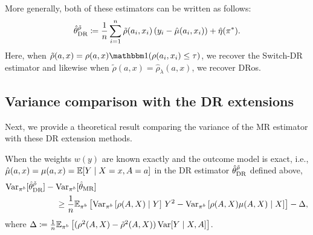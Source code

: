 More generally, both of these estimators can be written as follows:
\[
\hat{\theta}_{\textup{DR}}^{\tilde{\rho}} \coloneqq \frac{1}{n} \sum_{i=1}^n \tilde{\rho}(a_i, x_i)\,(y_i - \hat{\mu}(a_i, x_i)) + \hat{\eta}(\pi^*).
\]
Here, when $\tilde{\rho}(a, x) = \rho(a, x)\ind(\rho(a_i, x_i) \leq \tau)$, we recover the Switch-DR estimator and likewise when $\tilde{\rho}(a, x) = \hat{\rho}_\lambda(a, x)$, we recover DRos. 

\subsection{Variance comparison with the DR extensions}
Next, we provide a theoretical result comparing the variance of the MR estimator with these DR extension methods.
\begin{proposition}\label{prop:var_dr_extensions}
    When the weights $w(y)$ are known exactly and the outcome model is exact, i.e., $\hat{\mu}(a, x) = \mu(a, x) = \mathbb{E}[Y \mid X=x, A=a]$ in the DR estimator $\hat{\theta}_{\textup{DR}}^{\tilde{\rho}}$ defined above,
    \begin{align*}
    &\textup{Var}_{\pi^b}[\hat{\theta}_{\textup{DR}}^{\tilde{\rho}}] - \textup{Var}_{\pi^b}[\hat{\theta}_{\textup{MR}}]\\
    &\qquad \qquad \qquad  \geq \frac{1}{n} \mathbb{E}_{\pi^b} \left[ \textup{Var}_{\pi^b}\left[ \rho(A, X) \mid Y \right]\, Y^2 -  \textup{Var}_{\pi^b}\left[ \rho(A, X)\mu(A, X) \mid X \right] \right] - \Delta,
\end{align*}
where $\Delta \coloneqq \frac{1}{n}\mathbb{E}_{\pi^b}\left[(\rho^2(A, X) - \tilde{\rho}^2(A, X))\,\textup{Var}[Y\mid X, A]\right]$. 
\end{proposition}

